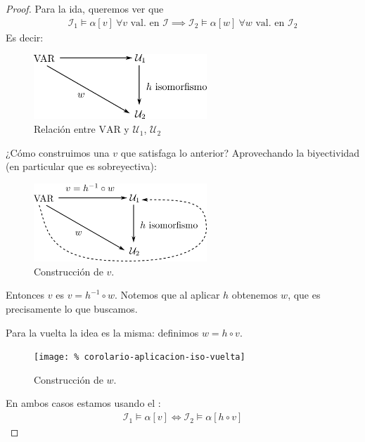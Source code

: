\begin{proof} \phantom{.}

    Para la ida, queremos ver que 
    \begin{gather*}
        \mathcal{I}_1 \vDash \alpha[v] ~ \forall v 
        \text{ val. en } \mathcal{I}
        \implies \mathcal{I}_2 \vDash \alpha[w] ~ \forall w \text{ val. en }
        \mathcal{I}_2
    \end{gather*}
    Es decir:
    \begin{figure}[H]
        \centering
        \includegraphics[width=0.58\textwidth]{corolario-aplicacion-iso-ida-1}
        \caption{Relación entre $\mathrm{VAR}$ y $\mathcal{U}_1$, 
        $\mathcal{U}_2$}
    \end{figure}
    ¿Cómo construimos una $v$ que satisfaga lo anterior? Aprovechando la
    biyectividad (en particular que es sobreyectiva):
    \begin{figure}[H]
        \centering
        \includegraphics[width=0.58\textwidth]{corolario-aplicacion-iso-ida-2}
        \caption{Construcción de $v$.}
    \end{figure}
    Entonces $v$ es $v = h^{-1} \circ w$. Notemos que al aplicar $h$ 
    obtenemos $w$, que es precisamente lo que buscamos.

    Para la vuelta la idea es la misma: definimos $w = h \circ v$.
    \begin{figure}[H]
        \centering
        \texttt{[image: \%
            corolario-aplicacion-iso-vuelta]}
        \caption{Construcción de $w$.}
    \end{figure}
    En ambos casos estamos usando el :
    \begin{gather*}
        \mathcal{I}_1 \vDash \alpha[v] 
        \iff \mathcal{I}_2 \vDash \alpha [h \circ v] 
    \end{gather*}
\end{proof}

